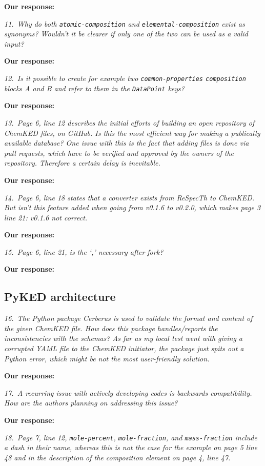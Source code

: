 \documentclass[a4paper,10pt]{elsarticle}
\begin{document}
\textbf{Our response:}

\textit{11.~Why do both \texttt{atomic-composition} and \texttt{elemental-composition} exist as synonyms? Wouldn't it be clearer if only one of the two can be used as a valid input?}

\textbf{Our response:}


\textit{12.~Is it possible to create for example two \texttt{common-properties} \texttt{composition} blocks A and B and refer to them in the \texttt{DataPoint} keys?}

\textbf{Our response:}


\textit{13.~Page 6, line 12 describes the initial efforts of building an open repository of ChemKED files, on GitHub. Is this the most efficient way for making a publically available database? One issue with this is the fact that adding files is done via pull requests, which have to be verified and approved by the owners of the repository. Therefore a certain delay is inevitable.}

\textbf{Our response:}

\textit{14.~Page 6, line 18 states that a converter exists from ReSpecTh to ChemKED. But isn't this feature added when going from v0.1.6 to v0.2.0, which makes page 3 line 21: v0.1.6 not correct.}

\textbf{Our response:}


\textit{15.~Page 6, line 21, is the `,' necessary after fork?}

\textbf{Our response:}


\subsection*{PyKED architecture}

\textit{16.~The Python package Cerberus is used to validate the format and content of the given ChemKED file. How does this package handles/reports the inconsistencies with the schemas? As far as my local test went with giving a corrupted YAML file to the ChemKED initiator, the package just spits out a Python error, which might be not the most user-friendly solution.}

\textbf{Our response:}


\textit{17.~A recurring issue with actively developing codes is backwards compatibility. How are the authors planning on addressing this issue?}

\textbf{Our response:}


\textit{18.~Page 7, line 12, \texttt{mole-percent}, \texttt{mole-fraction}, and \texttt{mass-fraction} include a dash in their name, whereas this is not the case for the example on page 5 line 48 and in the description of the composition element on page 4, line 47.}
\end{document}
